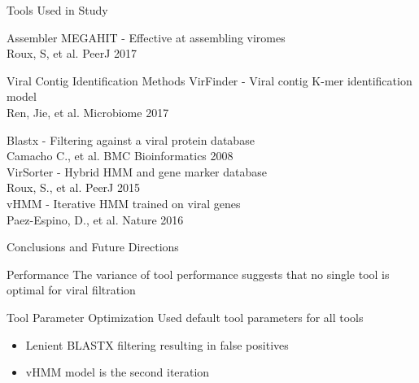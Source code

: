 \documentclass[11pt]{beamer}
\begin{document}
	\begin{frame}{Tools Used in Study}
	\begin{block}{Assembler}
	MEGAHIT - Effective at assembling viromes \\
	\tiny{Roux, S, et al. PeerJ 2017}
	\end{block}
	
	\begin{block}{Viral Contig Identification Methods}
	VirFinder - Viral contig K-mer identification model \\ 
	\tiny{Ren, Jie, et al. Microbiome 2017}
	
	\large{Blastx - Filtering against a viral protein database} \\
	\tiny{Camacho C., et al. BMC Bioinformatics 2008} \\
	
	\large{VirSorter - Hybrid HMM and gene marker database} \\
	\tiny{Roux, S., et al. PeerJ 2015} \\
	
	\large{vHMM - Iterative HMM trained on viral genes} \\
	\tiny{Paez-Espino, D., et al. Nature 2016} 
	
	\end{block}
	
	
	\end{frame}
	
	\begin{frame}{Conclusions and Future Directions}
	
	\begin{block}{Performance}
	  The variance of tool performance suggests that no single tool is optimal for viral filtration
	\end{block}
	
	
	\begin{block}{Tool Parameter Optimization}
	Used default tool parameters for all tools
	\begin{itemize}
	\item Lenient BLASTX filtering resulting in false positives
	\item vHMM model is the second iteration
	\end{itemize}
	\end{block}
	
  \end{frame}
	
\end{document}
